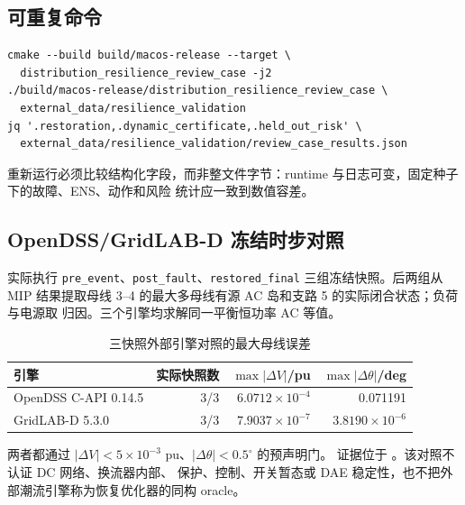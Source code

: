 \subsection{可重复命令}
\begin{verbatim}
cmake --build build/macos-release --target \
  distribution_resilience_review_case -j2
./build/macos-release/distribution_resilience_review_case \
  external_data/resilience_validation
jq '.restoration,.dynamic_certificate,.held_out_risk' \
  external_data/resilience_validation/review_case_results.json
\end{verbatim}
重新运行必须比较结构化字段，而非整文件字节：runtime 与日志可变，固定种子下的故障、ENS、动作和风险
统计应一致到数值容差。

\subsection{OpenDSS/GridLAB-D 冻结时步对照}
实际执行 \texttt{pre\_event}、\texttt{post\_fault}、\texttt{restored\_final} 三组冻结快照。后两组从
MIP 结果提取母线 3--4 的最大多母线有源 AC 岛和支路 5 的实际闭合状态；负荷与电源取
\fld{bus\_supply\_*} 归因。三个引擎均求解同一平衡恒功率 AC 等值。
\begin{table}[H]\centering\small
\caption{三快照外部引擎对照的最大母线误差}
\begin{tabular}{lrrr}
\toprule
引擎 & 实际快照数 & $\max|\Delta V|$/pu & $\max|\Delta\theta|$/deg\\\midrule
OpenDSS C-API 0.14.5 & 3/3 & $6.0712\times10^{-4}$ & 0.071191\\
GridLAB-D 5.3.0 & 3/3 & $7.9037\times10^{-7}$ & $3.8190\times10^{-6}$\\
\bottomrule
\end{tabular}
\end{table}
两者都通过 $|\Delta V|<5\times10^{-3}$ pu、$|\Delta\theta|<0.5^{\circ}$ 的预声明门。
证据位于 。该对照不认证 DC 网络、换流器内部、
保护、控制、开关暂态或 DAE 稳定性，也不把外部潮流引擎称为恢复优化器的同构 oracle。
